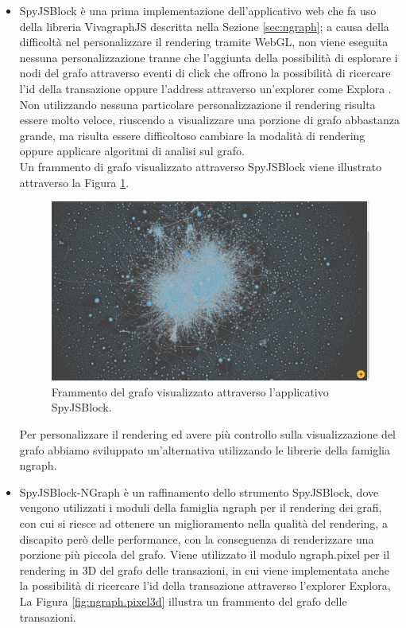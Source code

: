\begin{itemize}
  \item SpyJSBlock è una prima implementazione dell'applicativo web che fa uso della libreria VivagraphJS descritta nella Sezione \ref{sec:ngraph}; a causa  della difficoltà nel personalizzare il rendering tramite WebGL, non viene eseguita nessuna personalizzazione tranne che l'aggiunta della possibilità di esplorare i nodi del grafo attraverso eventi di click che offrono la possibilità di ricercare l'id della transazione oppure l'address attraverso un'explorer come Explora \cite{blockstream:esplora}.\\
  Non utilizzando nessuna particolare personalizzazione il rendering risulta essere molto veloce, riuscendo a visualizzare una porzione di grafo abbastanza grande, ma risulta essere difficoltoso cambiare la modalità di rendering oppure applicare algoritmi di analisi sul grafo.\\
  Un frammento di grafo visualizzato attraverso SpyJSBlock viene illustrato attraverso la Figura \ref{fig:vivagraphSpyJSBlock}.

  \begin{figure}
  \centering
   \includegraphics[scale=0.2]{images/demo/vivagraph.png}
   \caption{Frammento del grafo visualizzato attraverso l'applicativo SpyJSBlock.}\label{fig:vivagraphSpyJSBlock}
  \end{figure}

  Per personalizzare il rendering ed avere più controllo sulla visualizzazione del grafo abbiamo sviluppato un'alternativa utilizzando le librerie della famiglia ngraph.
  \item SpyJSBlock-NGraph è un raffinamento dello strumento SpyJSBlock, dove vengono utilizzati i moduli della famiglia ngraph per il rendering dei grafi, con cui si riesce ad ottenere un miglioramento nella qualità del rendering, a discapito però delle performance, con la conseguenza di renderizzare una porzione più piccola del grafo.
  Viene utilizzato il modulo ngraph.pixel per il rendering in 3D del grafo delle transazioni, in cui viene implementata anche la possibilità di ricercare l'id della transazione attraverso l'explorer Explora, La Figura \ref{fig:ngraph.pixel3d} illustra un frammento del grafo delle transazioni.


\end{itemize}
